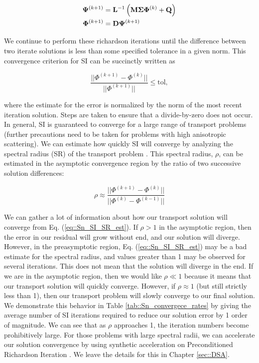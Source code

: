\begin{equation}
\label{eq::Sn_si_iter}
\begin{aligned}
 {\bf \Psi}^{(k+1)} &= {\bf L}^{-1} \left(  {\bf M} {\bf \Sigma} {\bf \Phi}^{(k)} +  {\bf Q} \right) \\
{\bf \Phi}^{(k+1)} &=  {\bf D} {\bf \Psi}^{(k+1)}
\end{aligned}
\end{equation}

We continue to perform these richardson iterations until the difference between two iterate solutions is less than some specified tolerance in a given norm. This convergence criterion for SI can be succinctly written as

\begin{equation}
\label{eq::Sn_SI_conv_crit}
\frac{|| \Phi^{(k+1)} - \Phi^{(k)} ||}{|| \Phi^{(k+1)} ||} \leq \text{tol} ,
\end{equation}

\noindent where the estimate for the error is normalized by the norm of the most recent iteration solution. Steps are taken to ensure that a divide-by-zero does not occur. In general, SI is guaranteed to converge for a large range of transport problems (further precautions need to be taken for problems with high anisotropic scattering). We can estimate how quickly SI will converge by analyzing the spectral radius (SR) of the transport problem \cite{ref::adams_larsen_iter_methods}. This spectral radius, $\rho$, can be estimated in the asymptotic convergence region by the ratio of two successive solution differences:

\begin{equation}
\label{eq::Sn_SI_SR_est}
\rho \approx \frac{|| \Phi^{(k+1)} - \Phi^{(k)} ||}{|| \Phi^{(k)} - \Phi^{(k-1)} ||} 
\end{equation}

\noindent We can gather a lot of information about how our transport solution will converge from Eq. (\ref{eq::Sn_SI_SR_est}). If $\rho>1$ in the asymptotic region, then the error in our residual will grow without end, and our solution will diverge. However, in the preasymptotic region, Eq. (\ref{eq::Sn_SI_SR_est}) may be a bad estimate for the spectral radius, and values greater than 1 may be observed for several iterations. This does not mean that the solution will diverge in the end. If we are in the asymptotic region, then we would like $\rho \ll 1$ because it means that our transport solution will quickly converge. However, if $\rho \approx 1$ (but still strictly less than 1), then our transport problem will slowly converge to our final solution. We demonstrate this behavior in Table \ref{tab::Sn_convergece_rates} by giving the average number of SI iterations required to reduce our solution error by 1 order of magnitude. We can see that as $\rho$ approaches 1, the iteration numbers become prohibitively large. For those problems with large spectral radii, we can accelerate our solution convergence by using synthetic acceleration on Preconditioned Richardson Iteration \cite{ref::adams_larsen_iter_methods}. We leave the details for this in Chapter \ref{sec::DSA}.

